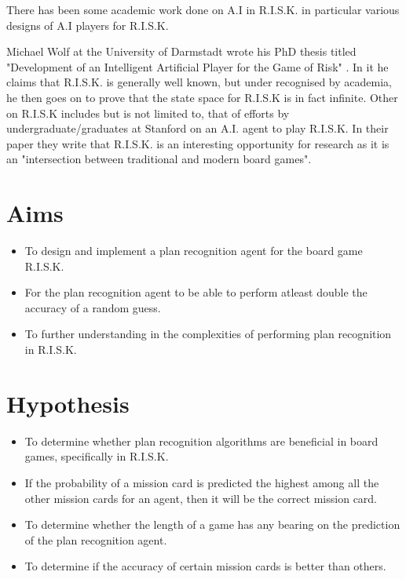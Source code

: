 \documentclass[parskip]{cs4rep}
\begin{document}
There has been some academic work done on A.I in R.I.S.K. in particular various designs of A.I players for R.I.S.K.

Michael Wolf at the University of Darmstadt wrote his PhD thesis titled "Development of an Intelligent Artificial Player for the Game of Risk" \cite{michaelwolf}. In it he claims that R.I.S.K. is generally well known, but under recognised by academia, he then goes on to prove that the state space for R.I.S.K is in fact infinite. Other on R.I.S.K includes but is not limited to, that of efforts by undergraduate/graduates at Stanford on an A.I. \cite{jlozanodbratz} agent to play R.I.S.K. In their paper they write that R.I.S.K. is an interesting opportunity for research as it is an "intersection between traditional and modern board games".

\section{Aims}

\begin{itemize}
\item
To design and implement a plan recognition agent for the board game R.I.S.K.
\item
For the plan recognition agent to be able to perform atleast double the accuracy of a random guess.
\item
To further understanding in the complexities of performing plan recognition in R.I.S.K.
\end{itemize}

\section{Hypothesis}

\begin{itemize}
\item
To determine whether plan recognition algorithms are beneficial in board games, specifically in R.I.S.K.
\item
If the probability of a mission card is predicted the highest among all the other mission cards for an agent, then it will be the correct mission card.
\item
To determine whether the length of a game has any bearing on the prediction of the plan recognition agent.
\item
To determine if the accuracy of certain mission cards is better than others.
\end{itemize}
\end{document}
